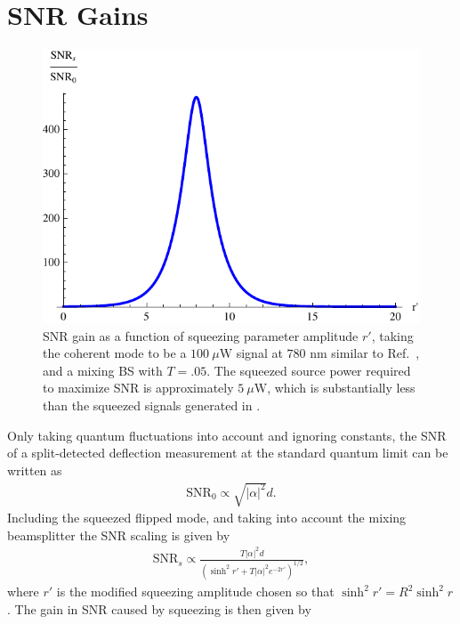 \section{SNR Gains}
\begin{figure}
  \begin{center}
    \centerline{\includegraphics[width=\columnwidth]{./SqueezedLight/figures/squeezedsnrgain.pdf}}
  \end{center}
  \caption[SNR gain as a function of the real part of the squeezing parameter.]{SNR gain as a function of squeezing parameter amplitude $r'$, taking the coherent mode to be a $100 \: \mu \text{W}$ signal at $780 \text{ nm}$ similar to Ref.~\cite{Dixon2009}, and a mixing BS with $T=.05$.  The squeezed source power required to maximize SNR is approximately $5 \: \mu \text{W}$, which is substantially less than the squeezed signals generated in \cite{Vahlbruch2005,Vahlbruch2008}. }  
  \label{fig:squeezedsnrgain}
\end{figure}
Only taking quantum fluctuations into account and ignoring constants, the SNR of a split-detected deflection measurement at the standard quantum limit can be written as \cite{Barnett2003}
\begin{align}
\text{SNR}_0 \propto \sqrt{|\alpha |^2} d .
\end{align}
Including the squeezed flipped mode, and taking into account the mixing beamsplitter the SNR scaling is given by
\begin{align}
\text{SNR}_s \propto \frac{T|\alpha |^2 d}{(\sinh^2 r' + T|\alpha |^2 e^{-2r'})^{1/2}},
\end{align}
where $r'$ is the modified squeezing amplitude chosen so that $\sinh^2 r' = R^2 \sinh^2 r$.  The gain in SNR caused by squeezing is then given by
